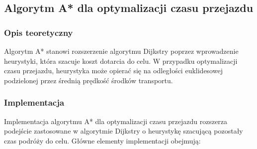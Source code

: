 \documentclass[12pt,a4paper]{article}
\begin{document}
\subsection{Algorytm A* dla optymalizacji czasu przejazdu}
\subsubsection{Opis teoretyczny}
Algorytm A* stanowi rozszerzenie algorytmu Dijkstry poprzez wprowadzenie heurystyki, która szacuje koszt dotarcia do celu. W przypadku optymalizacji czasu przejazdu, heurystyka może opierać się na odległości euklidesowej podzielonej przez średnią prędkość środków transportu.

\subsubsection{Implementacja}
Implementacja algorytmu A* dla optymalizacji czasu przejazdu rozszerza podejście zastosowane w algorytmie Dijkstry o heurystykę szacującą pozostały czas podróży do celu. Główne elementy implementacji obejmują:
\end{document}
